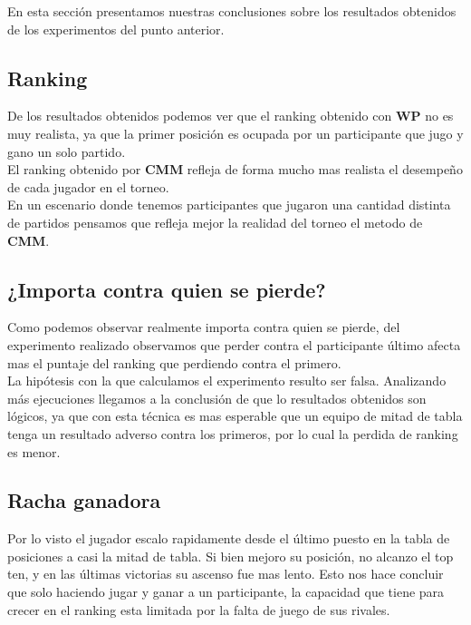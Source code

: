 En esta sección presentamos nuestras conclusiones sobre los resultados obtenidos de los experimentos del punto anterior. \\

\subsection{Ranking}

De los resultados obtenidos podemos ver que el ranking obtenido con \textbf{WP} no es muy realista, ya que la primer posición es ocupada por un participante que jugo y gano un solo partido. \\

El ranking obtenido por \textbf{CMM} refleja de forma mucho mas realista el desempeño de cada jugador en el torneo. \\

En un escenario donde tenemos participantes que jugaron una cantidad distinta de partidos pensamos que refleja mejor la realidad del torneo el metodo de \textbf{CMM}. \\


\subsection{¿Importa contra quien se pierde?}

Como podemos observar realmente importa contra quien se pierde, del experimento realizado observamos que perder contra el participante último afecta mas el puntaje del ranking que perdiendo 
contra el primero. \\

La hipótesis con la que calculamos el experimento resulto ser falsa. Analizando más ejecuciones llegamos a la conclusión de que lo resultados obtenidos son lógicos, ya que con esta técnica 
es mas esperable que un equipo de mitad de tabla tenga un resultado adverso contra los primeros, por lo cual la perdida de ranking es menor. \\


\subsection{Racha ganadora}

Por lo visto el jugador escalo rapidamente desde el último puesto en la tabla de posiciones a casi la mitad de tabla. Si bien mejoro su posición, no alcanzo el top ten, y en las últimas victorias su ascenso fue mas lento. Esto nos hace concluir que solo haciendo jugar y ganar a un participante, la capacidad que tiene para crecer en el ranking esta limitada por la falta de juego de sus rivales.

